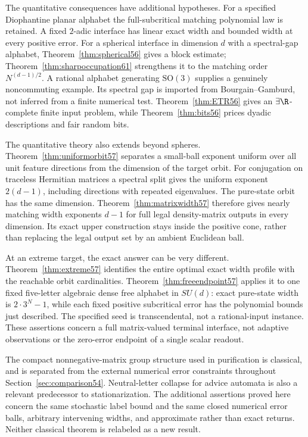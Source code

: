 The quantitative consequences have additional hypotheses. For a specified Diophantine planar alphabet the full-subcritical matching polynomial law is retained. A fixed $2$-adic interface has linear exact width and bounded width at every positive error. For a spherical interface in dimension $d$ with a spectral-gap alphabet, Theorem~\ref{thm:spherical56} gives a block estimate; Theorem~\ref{thm:sharpoccupation61} strengthens it to the matching order $N^{(d-1)/2}$. A rational alphabet generating $\mathrm{SO}(3)$ supplies a genuinely noncommuting example. Its spectral gap is imported from Bourgain--Gamburd, not inferred from a finite numerical test. Theorem~\ref{thm:ETR56} gives an $\exists\R$-complete finite input problem, while Theorem~\ref{thm:bits56} prices dyadic descriptions and fair random bits.


The quantitative theory also extends beyond spheres. Theorem~\ref{thm:uniformorbit57} separates a small-ball exponent uniform over all unit feature directions from the dimension of the target orbit. For conjugation on traceless Hermitian matrices a spectral split gives the uniform exponent $2(d-1)$, including directions with repeated eigenvalues. The pure-state orbit has the same dimension. Theorem~\ref{thm:matrixwidth57} therefore gives nearly matching width exponents $d-1$ for full legal density-matrix outputs in every dimension. Its exact upper construction stays inside the positive cone, rather than replacing the legal output set by an ambient Euclidean ball.

At an extreme target, the exact answer can be very different. Theorem~\ref{thm:extreme57} identifies the entire optimal exact width profile with the reachable orbit cardinalities. Theorem~\ref{thm:freeendpoint57} applies it to one fixed five-letter algebraic dense free alphabet in $SU(d)$: exact pure-state width is $2\cdot3^N-1$, while each fixed positive subcritical error has the polynomial bounds just described. The specified seed is transcendental, not a rational-input instance. These assertions concern a full matrix-valued terminal interface, not adaptive observations or the zero-error endpoint of a single scalar readout.

The compact nonnegative-matrix group structure used in purification is classical, and is separated from the external numerical error constraints throughout Section~\ref{sec:comparison54}. Neutral-letter collapse for advice automata is also a relevant predecessor to stationarization. The additional assertions proved here concern the same stochastic label bound and the same closed numerical error balls, arbitrary intervening widths, and approximate rather than exact returns. Neither classical theorem is relabeled as a new result.

